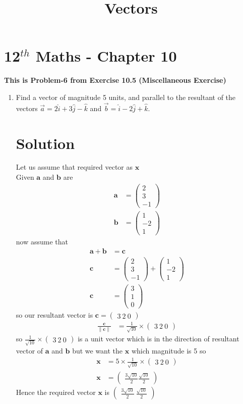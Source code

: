 \documentclass[12pt]{article}
\newcommand{\myvec}[1]{\ensuremath{\begin{pmatrix}#1\end{pmatrix}}}
\providecommand{\norm}[1]{\left\lVert#1\right\rVert}
\let\vec\mathbf
\begin{document}
\begin{center}
\title{\textbf{  Vectors}}
\date{\vspace{-5ex}} %
\maketitle
\end{center}
\setcounter{page}{1}\section{12$^{th}$ Maths - Chapter 10}
\textbf{This is Problem-6 from Exercise 10.5 (Miscellaneous Exercise)}
\begin{enumerate}

\item Find a vector of magnitude 5 units, and parallel to the resultant of the vectors $\overrightarrow{a}=2\hat{i}+3\hat{j}-\hat{k}$ and $\overrightarrow{b}=
\hat{i}-2\hat{j}+\hat{k}.$
\section{Solution}
Let us assume that required vector as $\vec{x}$\\ 
Given $\vec{a}$ and $\vec{b}$ are
\begin{align}
\vec{a}&=\myvec{2\\3\\-1}\\
\vec{b}&=\myvec{1\\-2\\1}
\end{align}
now assume that
\begin{align}
\vec{a}+\vec{b}&= \vec{c}\\
\vec{c}&= \myvec{2\\3\\-1}+\myvec{1\\-2\\1}\\
\vec{c}&=\myvec{3\\1\\0}
\end{align}
so our resultant vector is $\vec{c}=\myvec{3\ 2\ 0}$\\
\begin{align}
 \frac{\vec{c}}{\norm{\vec{c}}} &= \frac{1}{\sqrt{10}}\times\myvec{3\ 2\ 0}
\end{align}
so $\frac{1}{\sqrt{10}}\times\myvec{3\ 2\ 0}$ is a unit vector which is in the  direction of resultant vector of $\vec{a}$ and $\vec{b}$ but we want the $\vec{x}$ which  magnitude is  5 so 
\begin{align}
 \vec{x}&=5\times \frac{1}{\sqrt{10}}\times\myvec{3\ 2\ 0} \\
 \vec{x}&=\myvec{\frac{3\sqrt{10}}{2} \frac{\sqrt{10}}{2}}
\end{align}
Hence the required vector $\vec{x}$ is $\myvec{\frac{3\sqrt{10}}{2}\ \frac{\sqrt{10}}{2}}$
\end{enumerate} 
\end{document}
